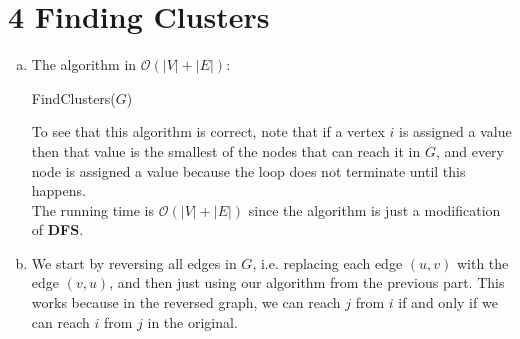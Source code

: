 \documentclass[11pt]{article}
\newenvironment{qparts}{\begin{enumerate}[(a)]}{\end{enumerate}}
\begin{document}
	\section*{4 Finding Clusters}
	\begin{qparts}
		\item The algorithm in $\mathcal{O}(|V| + |E|)$:\\
		\begin{algorithm}[H]
			\caption{FindClusters($G$)}
		\end{algorithm}
		To see that this algorithm is correct, note that if a vertex $i$ is assigned a value then that value is the smallest of the nodes that can reach it in $G$, and every node is assigned a value because the loop does not terminate until this happens.\\
		The running time is $\mathcal{O}(|V| + |E|)$ since the algorithm is just a modification of \textbf{DFS}.
		
		\item We start by reversing all edges in $G$, i.e. replacing each edge $(u, v)$ with the edge $(v, u)$, and then just using our algorithm from the previous part. This works because in the reversed graph, we can reach $j$ from $i$ if and only if we can reach $i$ from $j$ in the original.		
	\end{qparts}
	
	\vspace{0.7cm}
	
\end{document}
